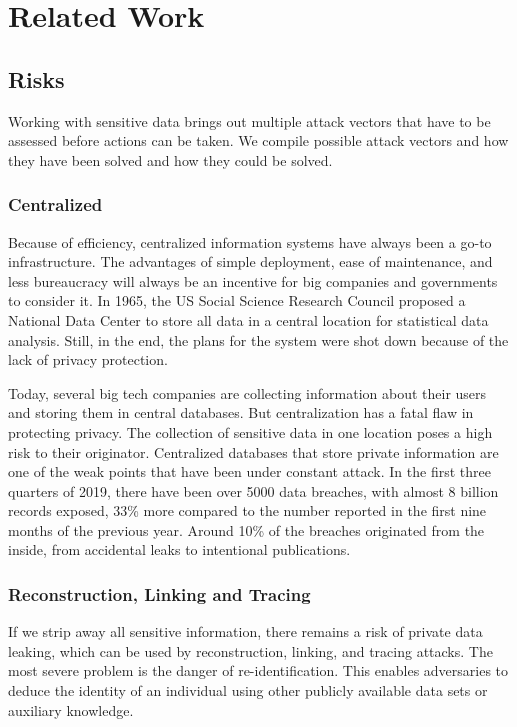 
\chapter{Related Work}\label{chapter:relatedwork}
\section{Risks}
Working with sensitive data brings out multiple attack vectors that have to be assessed before actions can be taken. We compile possible attack vectors and how they have been solved and how they could be solved.

\subsection{Centralized}
Because of efficiency, centralized information systems have always been a go-to infrastructure. The advantages of simple deployment, ease of maintenance, and less bureaucracy will always be an incentive for big companies and governments to consider it. In 1965, the US Social Science Research Council proposed a National Data Center to store all data in a central location for statistical data analysis. Still, in the end, the plans for the system were shot down because of the lack of privacy protection.

Today, several big tech companies are collecting information about their users and storing them in central databases. But centralization has a fatal flaw in protecting privacy. The collection of sensitive data in one location poses a high risk to their originator. Centralized databases that store private information are one of the weak points that have been under constant attack. In the first three quarters of 2019, there have been over 5000 data breaches, with almost 8 billion records exposed, 33\% more compared to the number reported in the first nine months of the previous year. Around 10\% of the breaches originated from the inside, from accidental leaks to intentional publications.

\subsection{Reconstruction, Linking and Tracing}
If we strip away all sensitive information, there remains a risk of private data leaking, which can be used by reconstruction, linking, and tracing attacks. The most severe problem is the danger of re-identification. This enables adversaries to deduce the identity of an individual using other publicly available data sets or auxiliary knowledge. 

